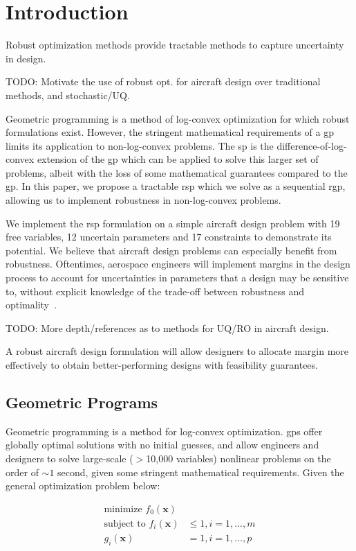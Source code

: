 \section{Introduction}
Robust optimization methods provide tractable methods to capture uncertainty in design.

TODO: Motivate the use of robust opt. for aircraft design over traditional methods, and stochastic/UQ.

Geometric programming is a method of log-convex optimization for which robust formulations exist.
However, the stringent mathematical requirements of a \gls{gp} limits its application to non-log-convex problems.
The \gls{sp} is the difference-of-log-convex extension of the \gls{gp} which can be applied to
solve this larger set of problems, albeit with the loss of some mathematical guarantees compared to the \gls{gp}.
In this paper, we propose a tractable \gls{rsp} which we solve as a sequential \gls{rgp},
allowing us to implement robustness in non-log-convex problems.

We implement the \gls{rsp} formulation on a simple aircraft design problem with 19 free variables,
12 uncertain parameters and 17 constraints to demonstrate its potential. We believe that aircraft design
problems can especially benefit from robustness. Oftentimes, aerospace engineers will implement
margins in the design process to account for uncertainties in parameters that a design may be sensitive to,
without explicit knowledge of the trade-off between robustness and optimality~\cite{yao2011}.

TODO: More depth/references as to methods for UQ/RO in aircraft design.

A robust aircraft design formulation will allow designers to allocate margin more effectively
to obtain better-performing designs with feasibility guarantees.

\subsection{Geometric Programs}

Geometric programming is a method for log-convex optimization.
\gls{gp}s offer globally optimal solutions with no initial guesses,
and allow engineers and designers to solve large-scale ($>$10,000 variables) nonlinear problems
on the order of $\sim1$ second, given some stringent mathematical requirements.
Given the general optimization problem below:

\begin{align}
\label{e:gpform}
\textrm{minimize } f_0(\mathbf{x}) & \nonumber \\
\textrm{subject to } f_i(\mathbf{x}) &\leq 1, i=1,...,m \\
g_i (\mathbf{x}) &= 1, i = 1,...,p \nonumber
\end{align}

